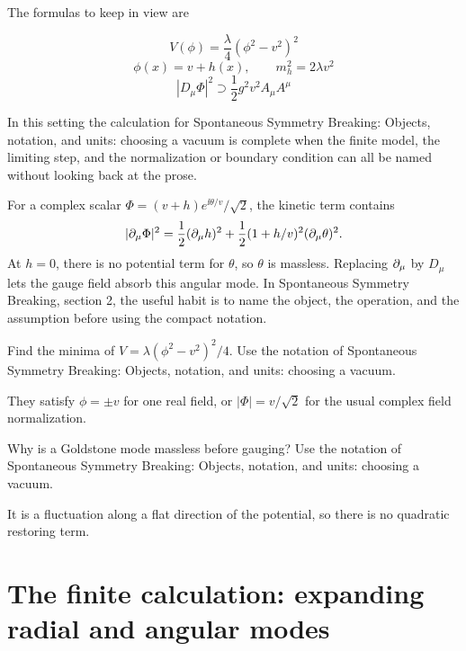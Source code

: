 The formulas to keep in view are

\[
  V(\phi)=\frac{\lambda}{4}(\phi^2-v^2)^2
\]
\[
  \phi(x)=v+h(x),\qquad m_h^2=2\lambda v^2
\]
\[
  |D_\mu\Phi|^2\supset \frac12g^2v^2A_\mu A^\mu
\]

In this setting the calculation for Spontaneous Symmetry Breaking: Objects, notation, and units: choosing a vacuum is complete when the finite model, the limiting step, and the normalization or boundary condition can all be named without looking back at the prose.




\begin{example}
For a complex scalar \(\Phi=(v+h)e^{\ii\theta/v}/\sqrt2\), the kinetic term contains
\[
  |\partial_\mu\Phi|^2=\frac12(\partial_\mu h)^2+\frac12(1+h/v)^2(\partial_\mu\theta)^2.
\]
At \(h=0\), there is no potential term for \(\theta\), so \(\theta\) is massless.  Replacing \(\partial_\mu\) by \(D_\mu\) lets the gauge field absorb this angular mode.  In Spontaneous Symmetry Breaking, section 2, the useful habit is to name the object, the operation, and the assumption before using the compact notation.
\end{example}



\begin{exercise}
Find the minima of \(V=\lambda(\phi^2-v^2)^2/4\).  Use the notation of Spontaneous Symmetry Breaking: Objects, notation, and units: choosing a vacuum.
\begin{answer}
They satisfy \(\phi=\pm v\) for one real field, or \(|\Phi|=v/\sqrt2\) for the usual complex field normalization.
\end{answer}
\end{exercise}

\begin{exercise}
Why is a Goldstone mode massless before gauging?  Use the notation of Spontaneous Symmetry Breaking: Objects, notation, and units: choosing a vacuum.
\begin{answer}
It is a fluctuation along a flat direction of the potential, so there is no quadratic restoring term.
\end{answer}
\end{exercise}



\section{The finite calculation: expanding radial and angular modes}

